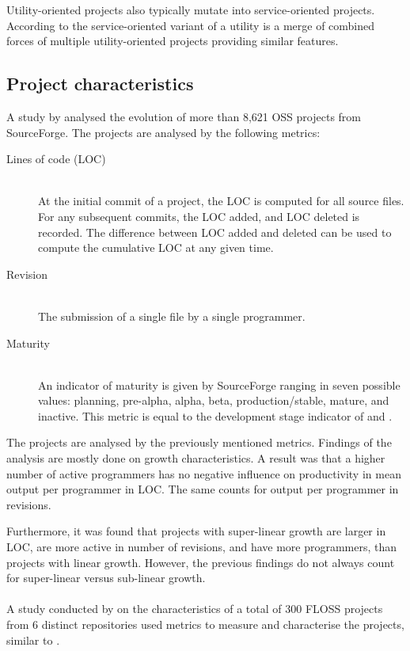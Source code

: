 Utility-oriented projects also typically mutate into service-oriented projects.
According to \citeauthor{nakakoji} the service-oriented variant of a utility is
a merge of combined forces of multiple utility-oriented projects providing
similar features.

\subsection{Project characteristics}
A study by \citet{koch2007} analysed the evolution of more than 8,621 OSS
projects from SourceForge. The projects are analysed by the following metrics:

\begin{description}
	\item[Lines of code (LOC)] \hfill \\ At the initial commit of a project,
		the LOC is computed for all source files. For any subsequent commits, the LOC
		added, and LOC deleted is recorded. The difference between LOC added and
		deleted can be used to compute the cumulative LOC at any given time.

	\item[Revision] \hfill \\ The submission of a single file by a single
		programmer.
		
	\item[Maturity] \hfill \\ An indicator of maturity is given by SourceForge
		ranging in seven possible values: planning, pre-alpha, alpha, beta,
		production/stable, mature, and inactive. This metric is equal to the
		development stage indicator of \citet{androutsellis} and
		\citet{crowston2006}.
\end{description}

\noindent
The projects are analysed by the previously mentioned metrics. Findings of the
analysis are mostly done on growth characteristics. A result was that a higher
number of active programmers has no negative influence on productivity in mean
output per programmer in LOC. The same counts for output per programmer in
revisions.

Furthermore, it was found that projects with super-linear growth are larger in
LOC, are more active in number of revisions, and have more programmers, than
projects with linear growth. However, the previous findings do not always count
for super-linear versus sub-linear growth.

\paragraph{}
A study conducted by \citet{beecher} on the characteristics of a total of
300 FLOSS projects from 6 distinct repositories used metrics to measure
and characterise the projects, similar to \citet{koch2007}.

